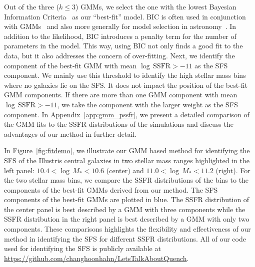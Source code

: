 \documentclass[tighten, preprint]{aastex62}
\begin{document}
Out of the three ($k\leq3$) GMMs, we select the one with the lowest Bayesian 
Information Criteria~\citep[BIC;][]{schwarz1978} as our ``best-fit'' model. 
BIC is often used in conjunction with GMMs~\citep[\emph{e.g.}][]{leroux1992,roeder1997,fraley1998,steele2010performance} 
and also more generally for model selection in 
astronomy~\citep[\emph{e.g.}][]{liddle2007,broderick2011,vakili2016}.
In addition to the likelihood, BIC introduces a penalty term for the number
of parameters in the model. This way, using BIC not only finds a good fit to 
the data, but it also addresses the concern of over-fitting. Next, we 
identify the component of the best-fit GMM with mean 
$\log\,\mathrm{SSFR} > −11$ as the SFS component. 
{\color{red}
We mainly use this threshold to identify the high stellar mass bins 
where no galaxies lie on the SFS. It does not impact the position of the 
best-fit GMM components. 
}
If there are more 
than one GMM component with mean $\log\,\mathrm{SSFR} > −11$, 
we take the component with the larger weight as the SFS component. 
{\color{red} In Appendix~\ref{app:gmm_pssfr}, we present a detailed 
comparison of the GMM fits to the SSFR distributions of the simulations 
and discuss the advantages of our method in further detail.} 


In Figure~\ref{fig:fitdemo}, we illustrate 
{\color{red} our GMM based method for identifying the SFS of the Illustris central galaxies} 
in two stellar mass ranges highlighted in the left panel: $10.4 < \log\,M_* < 10.6$ (center) 
and $11.0 < \log\,M_* < 11.2$ (right). For the two stellar mass bins, 
we compare the SSFR distributions of the bins to the components of the 
best-fit GMMs derived from our method. The SFS components of the best-fit 
GMMs are plotted in blue. The SSFR distribution of the center panel is best 
described by a GMM with three components while the SSFR distribution 
in the right  panel is best described by a GMM with only two components.
These comparisons highlights the flexibility and effectiveness 
of our method in identifying the SFS for different SSFR 
distributions. 
All of our code used for identifying the SFS is publicly available 
at \url{https://github.com/changhoonhahn/LetsTalkAboutQuench}.
\end{document}

